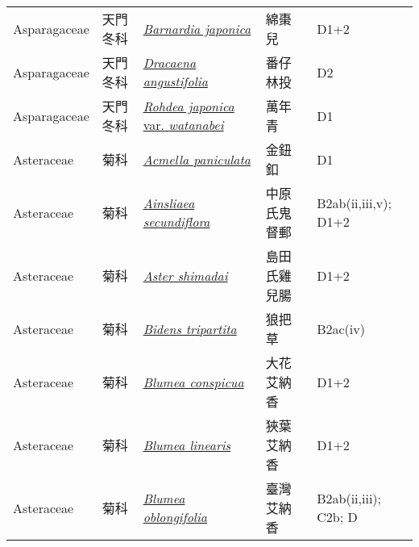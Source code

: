 {\begin{longtable}{p{2.5cm}p{2.5cm}p{4.5cm}p{2.5cm}p{3cm}}
    Asparagaceae & 天門冬科 & \href{http://www.theplantlist.org/tpl1.1/search?q=Barnardia+japonica}{\textit{Barnardia japonica} } & 綿棗兒 & D1+2 \index{Barnardia@\textit{Barnardia}!japonica@\textit{japonica}}  \index{綿棗兒} \\
    Asparagaceae & 天門冬科 & \href{http://www.theplantlist.org/tpl1.1/search?q=Dracaena+angustifolia}{\textit{Dracaena angustifolia} } & 番仔林投 & D2 \index{Dracaena@\textit{Dracaena}!angustifolia@\textit{angustifolia}}  \index{番仔林投} \\
    Asparagaceae & 天門冬科 & \href{http://www.theplantlist.org/tpl1.1/search?q=Rohdea+japonica+var.+watanabei}{\textit{Rohdea japonica} var. \textit{watanabei} } & 萬年青 & D1 \index{Rohdea@\textit{Rohdea}!japonica@\textit{japonica}!var. watanabei@var. \textit{watanabei}}  \index{萬年青} \\
    Asteraceae & 菊科 & \href{http://www.theplantlist.org/tpl1.1/search?q=Acmella+paniculata}{\textit{Acmella paniculata} } & 金鈕釦 & D1 \index{Acmella@\textit{Acmella}!paniculata@\textit{paniculata}}  \index{金鈕釦} \\
    Asteraceae & 菊科 & \href{http://www.theplantlist.org/tpl1.1/search?q=Ainsliaea+secundiflora}{\textit{Ainsliaea secundiflora} } & 中原氏鬼督郵 & B2ab(ii,iii,v); D1+2 \index{Ainsliaea@\textit{Ainsliaea}!secundiflora@\textit{secundiflora}}  \index{中原氏鬼督郵} \\
    Asteraceae & 菊科 & \href{http://www.theplantlist.org/tpl1.1/search?q=Aster+shimadai}{\textit{Aster shimadai} } & 島田氏雞兒腸 & D1+2 \index{Aster@\textit{Aster}!shimadai@\textit{shimadai}}  \index{島田氏雞兒腸} \\
    Asteraceae & 菊科 & \href{http://www.theplantlist.org/tpl1.1/search?q=Bidens+tripartita}{\textit{Bidens tripartita} } & 狼把草 & B2ac(iv) \index{Bidens@\textit{Bidens}!tripartita@\textit{tripartita}}  \index{狼把草} \\
    Asteraceae & 菊科 & \href{http://www.theplantlist.org/tpl1.1/search?q=Blumea+conspicua}{\textit{Blumea conspicua} } & 大花艾納香 & D1+2 \index{Blumea@\textit{Blumea}!conspicua@\textit{conspicua}}  \index{大花艾納香} \\
    Asteraceae & 菊科 & \href{http://www.theplantlist.org/tpl1.1/search?q=Blumea+linearis}{\textit{Blumea linearis} } & 狹葉艾納香 & D1+2 \index{Blumea@\textit{Blumea}!linearis@\textit{linearis}}  \index{狹葉艾納香} \\
    Asteraceae & 菊科 & \href{http://www.theplantlist.org/tpl1.1/search?q=Blumea+oblongifolia}{\textit{Blumea oblongifolia} } & 臺灣艾納香 & B2ab(ii,iii); C2b; D \index{Blumea@\textit{Blumea}!oblongifolia@\textit{oblongifolia}}  \index{臺灣艾納香} \\

\end{longtable}}
